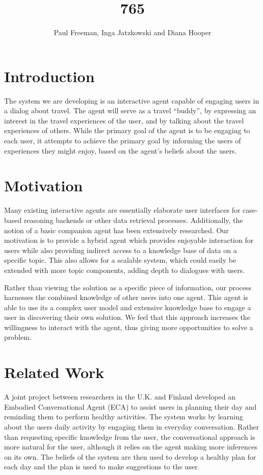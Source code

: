 \documentclass[11pt]{article} %
\title{765}
\author{Paul Freeman, Inga Jatzkowski and Diana Hooper}
\begin{document}
\maketitle
\newpage
\section{Introduction}
The system we are developing is an interactive agent capable of
engaging users in a dialog about travel. The agent will serve as
a travel ``buddy'', by expressing an interest in the travel
experiences of the user, and by talking about the travel
experiences of others. While the primary goal of the agent is
to be engaging to each user, it attempts to achieve the primary
goal by informing the users of experiences they might enjoy,
based on the agent’s beliefs about the users.

\section{Motivation}
Many existing interactive agents are essentially elaborate user
interfaces for case-based reasoning backends or other data retrieval
processes. Additionally, the notion of a basic companion agent has been
extensively researched. Our motivation is to provide a hybrid agent
which provides enjoyable interaction for users while also providing
indirect access to a knowledge base of data on a specific topic.
This also allows for a scalable system, which could easily be extended
with more topic components, adding depth to dialogues with users.

Rather than viewing the solution as a specific piece of information,
our process harnesses the combined knowledge of other users into one
agent. This agent is able to use its a complex user model and extensive
knowledge base to engage a user in discovering their own solution.
We feel that this approach increases the willingness to interact
with the agent, thus giving more opportunities to solve a problem.

\section{Related Work}
A joint project between researchers in the U.K. and Finland
developed an Embodied Conversational Agent (ECA) to assist
users in planning their day and reminding them to perform
healthy activities. The system works by learning about the
users daily activity by engaging them in everyday conversation.
Rather than requesting specific knowledge from the user, the
conversational approach is more natural for the user, although
it relies on the agent making more inferences on its own. The
beliefs of the system are then used to develop a healthy plan
for each day and the plan is used to make suggestions to the user.
\end{document}
